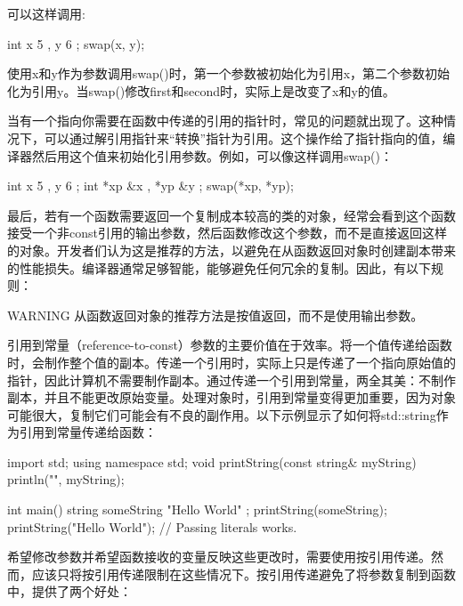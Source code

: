 可以这样调用:

\begin{cpp}
int x { 5 }, y { 6 };
swap(x, y);
\end{cpp}

使用x和y作为参数调用swap()时，第一个参数被初始化为引用x，第二个参数初始化为引用y。当swap()修改first和second时，实际上是改变了x和y的值。

当有一个指向你需要在函数中传递的引用的指针时，常见的问题就出现了。这种情况下，可以通过解引用指针来“转换”指针为引用。这个操作给了指针指向的值，编译器然后用这个值来初始化引用参数。例如，可以像这样调用swap()：

\begin{cpp}
int x { 5 }, y { 6 };
int *xp { &x }, *yp { &y };
swap(*xp, *yp);
\end{cpp}

最后，若有一个函数需要返回一个复制成本较高的类的对象，经常会看到这个函数接受一个非const引用的输出参数，然后函数修改这个参数，而不是直接返回这样的对象。开发者们认为这是推荐的方法，以避免在从函数返回对象时创建副本带来的性能损失。编译器通常足够智能，能够避免任何冗余的复制。因此，有以下规则：

\begin{myWarning}{WARNING}
从函数返回对象的推荐方法是按值返回，而不是使用输出参数。
\end{myWarning}


引用到常量（reference-to-const）参数的主要价值在于效率。将一个值传递给函数时，会制作整个值的副本。传递一个引用时，实际上只是传递了一个指向原始值的指针，因此计算机不需要制作副本。通过传递一个引用到常量，两全其美：不制作副本，并且不能更改原始变量。处理对象时，引用到常量变得更加重要，因为对象可能很大，复制它们可能会有不良的副作用。以下示例显示了如何将std::string作为引用到常量传递给函数：

\begin{cpp}
import std;
using namespace std;
void printString(const string& myString) { println("{}", myString); }

int main()
{
    string someString { "Hello World" };
    printString(someString);
    printString("Hello World"); // Passing literals works.
}
\end{cpp}


希望修改参数并希望函数接收的变量反映这些更改时，需要使用按引用传递。然而，应该只将按引用传递限制在这些情况下。按引用传递避免了将参数复制到函数中，提供了两个好处：

